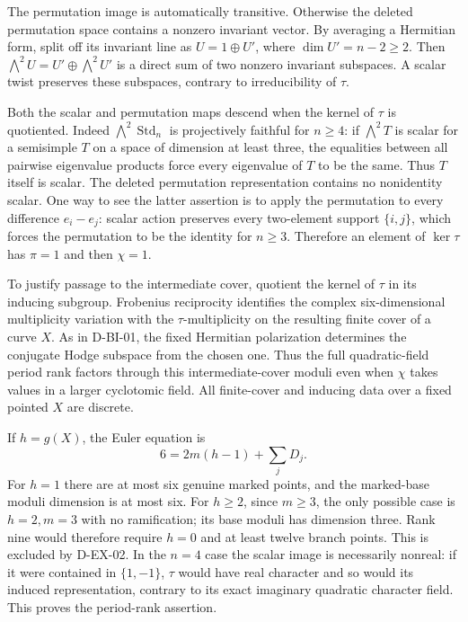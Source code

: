 The permutation image is automatically transitive.  Otherwise the
deleted permutation space contains a nonzero invariant vector.
By averaging a Hermitian form, split off its invariant line as
$U=1\oplus U'$, where $\dim U'=n-2\ge2$.  Then
$\bigwedge^2U=U'\oplus\bigwedge^2U'$ is a direct sum of two
nonzero invariant subspaces.  A scalar twist preserves these
subspaces, contrary to irreducibility of $\tau$.

Both the scalar and permutation maps descend when the kernel of
$\tau$ is quotiented.  Indeed $\bigwedge^2\operatorname{Std}_n$
is projectively faithful for $n\ge4$: if $\bigwedge^2T$ is scalar
for a semisimple $T$ on a space of dimension at least three, the
equalities between all pairwise eigenvalue products force every
eigenvalue of $T$ to be the same.  Thus $T$ itself is scalar.
The deleted permutation representation contains no nonidentity
scalar.  One way to see the latter assertion is to apply the
permutation to every difference $e_i-e_j$: scalar action preserves
every two-element support $\{i,j\}$, which forces the permutation
to be the identity for $n\ge3$.  Therefore an element of
$\ker\tau$ has $\pi=1$ and then $\chi=1$.

To justify passage to the intermediate cover, quotient the kernel
of $\tau$ in its inducing subgroup.  Frobenius reciprocity identifies
the complex six-dimensional multiplicity variation with the
$\tau$-multiplicity on the resulting finite cover of a curve $X$.
As in D-BI-01, the fixed Hermitian polarization determines the
conjugate Hodge subspace from the chosen one.  Thus the full
quadratic-field period rank factors through this intermediate-cover
moduli even when $\chi$ takes values in a larger cyclotomic field.
All finite-cover and inducing data over a fixed pointed $X$ are
discrete.

If $h=g(X)$, the Euler equation is
\[
                        6=2m(h-1)+\sum_jD_j.
                                                               \tag{EX.9}
\]
For $h=1$ there are at most six genuine marked points, and the
marked-base moduli dimension is at most six.  For $h\ge2$, since
$m\ge3$, the only possible case is $h=2,m=3$ with no ramification;
its base moduli has dimension three.  Rank nine would therefore
require $h=0$ and at least twelve branch points.  This is excluded
by D-EX-02.  In the $n=4$ case the scalar image is necessarily
nonreal: if it were contained in $\{1,-1\}$, $\tau$ would have
real character and so would its induced representation, contrary
to its exact imaginary quadratic character field.  This proves
the period-rank assertion.

